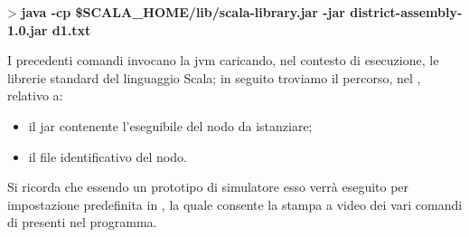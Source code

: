 > \textbf{java -cp \$SCALA\_HOME/lib/scala-library.jar -jar district-assembly-1.0.jar d1.txt}

I precedenti comandi invocano la \ac{jvm} caricando, nel contesto di esecuzione, le librerie standard del linguaggio Scala; in seguito troviamo il percorso, nel , relativo a:

\begin{itemize}
\item{il \acs{jar} contenente l'eseguibile del nodo da istanziare;}
\item{il file identificativo del nodo.}
\end{itemize}

Si ricorda che essendo un prototipo di simulatore esso verrà eseguito per impostazione predefinita in , la quale consente la stampa a video dei vari comandi di  presenti nel programma.